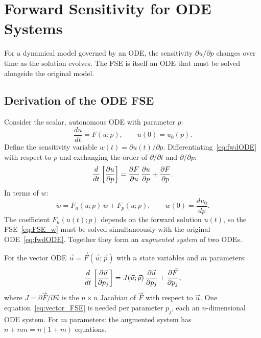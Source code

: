 \section{Forward Sensitivity for ODE Systems}
\label{sec:ODEFSE}

For a dynamical model governed by an ODE, the sensitivity
$\partial u/\partial p$ changes over time as the solution evolves.
The FSE is itself an ODE that must be solved alongside the
original model.

\subsection{Derivation of the ODE FSE}

Consider the scalar, autonomous ODE with parameter $p$:
\begin{equation}
  \frac{du}{dt} = F(u; p), \qquad u(0) = u_0(p).
  \label{eq:fwdODE}
\end{equation}
Define the sensitivity variable $w(t) = \partial u(t)/\partial p$.
Differentiating~\eqref{eq:fwdODE} with respect to $p$ and
exchanging the order of $\partial/\partial t$ and $\partial/\partial p$:
\begin{equation}
  \frac{d}{dt}\left[\frac{\partial u}{\partial p}\right] = \frac{\partial F}{\partial u}\,\frac{\partial u}{\partial p} + \frac{\partial F}{\partial p}.
  \label{eq:ODE_FSE_scalar}
\end{equation}
In terms of $w$:
\begin{equation}
  \dot{w} = F_u(u;p)\,w + F_p(u;p), \qquad
  w(0) = \frac{du_0}{dp}.
  \label{eq:FSE_w}
\end{equation}
The coefficient $F_u(u(t);p)$ depends on the forward solution $u(t)$,
so the FSE~\eqref{eq:FSE_w} must be solved simultaneously with
the original ODE~\eqref{eq:fwdODE}.
Together they form an \emph{augmented system} of two ODEs.

For the vector ODE $\dot{\vec{u}} = \vec{F}(\vec{u};\vec{p})$
with $n$ state variables and $m$ parameters:
\begin{equation}
  \frac{d}{dt}\left[\frac{\partial \vec{u}}{\partial p_j}\right]
  = J(\vec{u};\vec{p})\,\frac{\partial \vec{u}}{\partial p_j} + \frac{\partial \vec{F}}{\partial p_j},
  \label{eq:vector_FSE}
\end{equation}
where $J = \partial\vec{F}/\partial\vec{u}$ is the $n\times n$
Jacobian of $\vec{F}$ with respect to $\vec{u}$.
One equation~\eqref{eq:vector_FSE} is needed per parameter $p_j$,
each an $n$-dimensional ODE system.
For $m$ parameters: the augmented system has $n + mn = n(1+m)$ equations.

